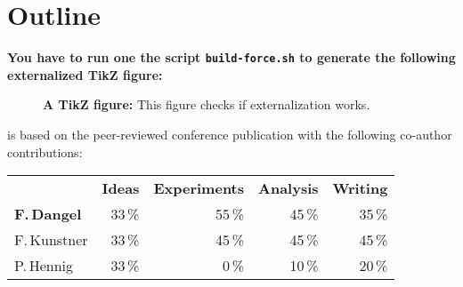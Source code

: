 \Blindtext[1]

\section{Outline}
\Blindtext

\textbf{You have to run one the script \texttt{build-force.sh} to generate the
  following externalized TikZ figure:}

\begin{figure}[!h]
  \centering
  \tikzexternalenable
  \tikzexternaldisable
  \caption{\textbf{A TikZ figure:} This figure checks if externalization works.}
\end{figure}

\begin{disclaimer}
   is based on the peer-reviewed
  conference publication with the following co-author contributions:

   \cite{dangel2020backpack}

  \vspace{-1.75ex}

  \begin{center}
    \begin{tabular}[!h]{lrrrr}
      & \textbf{Ideas} & \textbf{Experiments} & \textbf{Analysis} & \textbf{Writing}
      \\
      \textbf{F.\,Dangel} & 33\,\% & 55\,\% & 45\,\% & 35\,\%
      \\
      F.\,Kunstner & 33\,\%& 45\,\% & 45\,\% & 45\,\%
      \\
      P.\,Hennig & 33\,\% & 0\,\% & 10\,\% & 20\,\%
    \end{tabular}
  \end{center}
\end{disclaimer}


